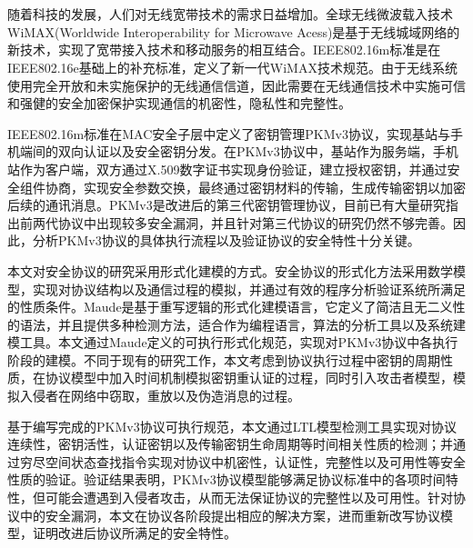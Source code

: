 \vspace{-2.5cm}
\chapter*{}
\vspace{-1cm}

随着科技的发展，人们对无线宽带技术的需求日益增加。全球无线微波载入技术WiMAX(Worldwide Interoperability for Microwave Acess)是基于无线城域网络的新技术，实现了宽带接入技术和移动服务的相互结合。IEEE802.16m标准是在IEEE802.16e基础上的补充标准，定义了新一代WiMAX技术规范。由于无线系统使用完全开放和未实施保护的无线通信信道，因此需要在无线通信技术中实施可信和强健的安全加密保护实现通信的机密性，隐私性和完整性。

IEEE802.16m标准在MAC安全子层中定义了密钥管理PKMv3协议，实现基站与手机端间的双向认证以及安全密钥分发。在PKMv3协议中，基站作为服务端，手机站作为客户端，双方通过X.509数字证书实现身份验证，建立授权密钥，并通过安全组件协商，实现安全参数交换，最终通过密钥材料的传输，生成传输密钥以加密后续的通讯消息。PKMv3是改进后的第三代密钥管理协议，目前已有大量研究指出前两代协议中出现较多安全漏洞，并且针对第三代协议的研究仍然不够完善。因此，分析PKMv3协议的具体执行流程以及验证协议的安全特性十分关键。

本文对安全协议的研究采用形式化建模的方式。安全协议的形式化方法采用数学模型，实现对协议结构以及通信过程的模拟，并通过有效的程序分析验证系统所满足的性质条件。Maude是基于重写逻辑的形式化建模语言，它定义了简洁且无二义性的语法，并且提供多种检测方法，适合作为编程语言，算法的分析工具以及系统建模工具。本文通过Maude定义的可执行形式化规范，实现对PKMv3协议中各执行阶段的建模。不同于现有的研究工作，本文考虑到协议执行过程中密钥的周期性质，在协议模型中加入时间机制模拟密钥重认证的过程，同时引入攻击者模型，模拟入侵者在网络中窃取，重放以及伪造消息的过程。

基于编写完成的PKMv3协议可执行规范，本文通过LTL模型检测工具实现对协议连续性，密钥活性，认证密钥以及传输密钥生命周期等时间相关性质的检测；并通过穷尽空间状态查找指令实现对协议中机密性，认证性，完整性以及可用性等安全性质的验证。验证结果表明，PKMv3协议模型能够满足协议标准中的各项时间特性，但可能会遭遇到入侵者攻击，从而无法保证协议的完整性以及可用性。针对协议中的安全漏洞，本文在协议各阶段提出相应的解决方案，进而重新改写协议模型，证明改进后协议所满足的安全特性。

\hspace{-0.5cm}
 